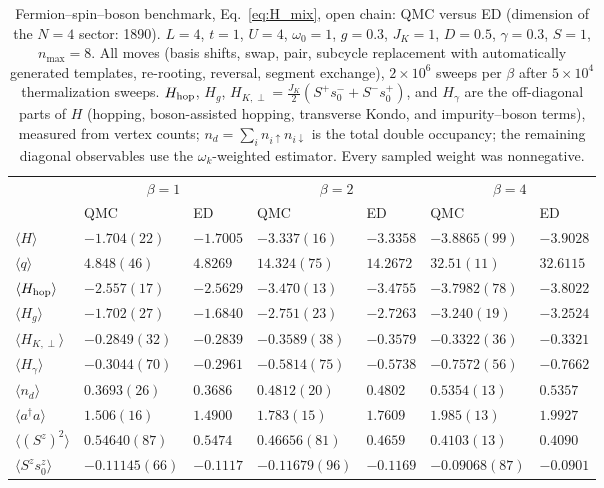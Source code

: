 \begin{table}[t]
\caption{Fermion--spin--boson benchmark, Eq.~\eqref{eq:H_mix}, open chain: QMC versus ED (dimension of the $N=4$ sector: 1890). $L=4$, $t=1$, $U=4$, $\omega_0=1$, $g=0.3$, $J_K=1$, $D=0.5$, $\gamma=0.3$, $S=1$, $n_{\max}=8$. All moves (basis shifts, swap, pair, subcycle replacement with automatically generated templates, re-rooting, reversal, segment exchange), $2\times10^6$ sweeps per $\beta$ after $5\times10^4$ thermalization sweeps. $H_{\rm hop}$, $H_g$, $H_{K,\perp}=\tfrac{J_K}{2}(S^+s_0^-+S^-s_0^+)$, and $H_\gamma$ are the off-diagonal parts of $H$ (hopping, boson-assisted hopping, transverse Kondo, and impurity--boson terms), measured from vertex counts; $n_d=\sum_i n_{i\uparrow}n_{i\downarrow}$ is the total double occupancy; the remaining diagonal observables use the $\omega_k$-weighted estimator. Every sampled weight was nonnegative.}
\label{tab:mix_open}
\begin{tabular}{l|ll|ll|ll}
\hline\hline
 & \multicolumn{2}{c|}{$\beta=1$} & \multicolumn{2}{c|}{$\beta=2$} & \multicolumn{2}{c}{$\beta=4$}\\
 & QMC & ED & QMC & ED & QMC & ED\\
\hline
$\langle H\rangle$ & $-1.704(22)$ & $-1.7005$ & $-3.337(16)$ & $-3.3358$ & $-3.8865(99)$ & $-3.9028$ \\
$\langle q\rangle$ & $4.848(46)$ & $4.8269$ & $14.324(75)$ & $14.2672$ & $32.51(11)$ & $32.6115$ \\
$\langle H_{\rm hop}\rangle$ & $-2.557(17)$ & $-2.5629$ & $-3.470(13)$ & $-3.4755$ & $-3.7982(78)$ & $-3.8022$ \\
$\langle H_g\rangle$ & $-1.702(27)$ & $-1.6840$ & $-2.751(23)$ & $-2.7263$ & $-3.240(19)$ & $-3.2524$ \\
$\langle H_{K,\perp}\rangle$ & $-0.2849(32)$ & $-0.2839$ & $-0.3589(38)$ & $-0.3579$ & $-0.3322(36)$ & $-0.3321$ \\
$\langle H_\gamma\rangle$ & $-0.3044(70)$ & $-0.2961$ & $-0.5814(75)$ & $-0.5738$ & $-0.7572(56)$ & $-0.7662$ \\
$\langle n_d\rangle$ & $0.3693(26)$ & $0.3686$ & $0.4812(20)$ & $0.4802$ & $0.5354(13)$ & $0.5357$ \\
$\langle a^\dagger a\rangle$ & $1.506(16)$ & $1.4900$ & $1.783(15)$ & $1.7609$ & $1.985(13)$ & $1.9927$ \\
$\langle (S^z)^2\rangle$ & $0.54640(87)$ & $0.5474$ & $0.46656(81)$ & $0.4659$ & $0.4103(13)$ & $0.4090$ \\
$\langle S^zs^z_0\rangle$ & $-0.11145(66)$ & $-0.1117$ & $-0.11679(96)$ & $-0.1169$ & $-0.09068(87)$ & $-0.0901$ \\
\hline\hline
\end{tabular}
\end{table}

